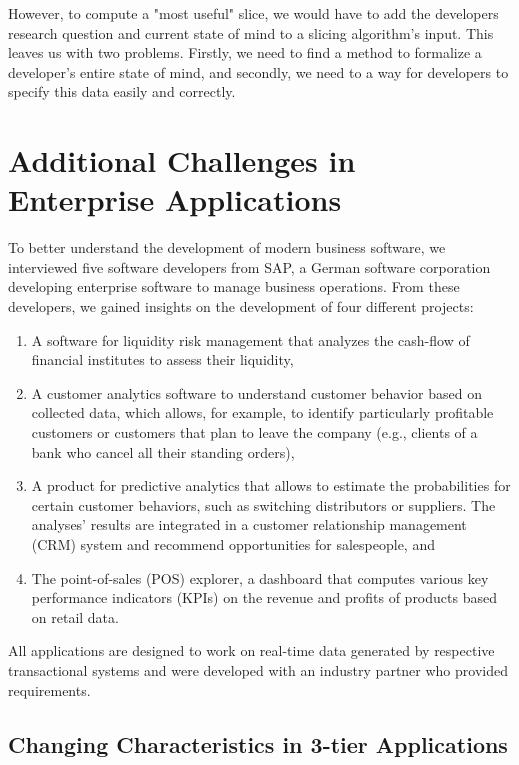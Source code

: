 However, to compute a "most useful" slice, we would have to add the developers research question and current state of mind to a slicing algorithm's input.
This leaves us with two problems.
Firstly, we need to find a method to formalize a developer's entire state of mind, and secondly, we need to a way for developers to specify this data easily and correctly.

\section{Additional Challenges in Enterprise Applications}

\tmpStart
To better understand the development of modern business software, we interviewed five software developers from SAP, a German software corporation developing enterprise software to manage business operations.
From these developers, we gained insights on the development of four different projects:
\begin{enumerate}
	\item A software for liquidity risk management that analyzes the cash-flow of financial institutes to assess their liquidity,
	\item A customer analytics software to understand customer behavior based on collected data, which allows, for example, to identify particularly profitable customers or customers that plan to leave the company (e.g., clients of a bank who cancel all their standing orders),
	\item A product for predictive analytics that allows to estimate the probabilities for certain customer behaviors, such as switching distributors or suppliers. The analyses' results are integrated in a customer relationship management (CRM) system and recommend opportunities for salespeople, and
	\item The point-of-sales (POS) explorer, a dashboard that computes various key performance indicators (KPIs) on the revenue and profits of products based on retail data.
\end{enumerate}
%
All applications are designed to work on real-time data generated by respective transactional systems and were developed with an industry partner who provided requirements.

\subsection{Changing Characteristics in 3-tier Applications}

